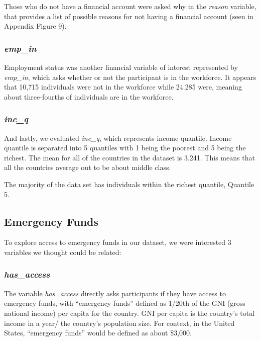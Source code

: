 \documentclass[water,article,submit,moreauthors,pdftex]{mdpi}
\begin{document}
Those who do not have a financial account were asked why in the
\emph{reason} variable, that provides a list of possible reasons for not
having a financial account (seen in Appendix Figure 9).

\hypertarget{emp_in}{%
\subsubsection{\texorpdfstring{\emph{emp\_in}}{emp\_in}}\label{emp_in}}

Employment status was another financial variable of interest represented
by \emph{emp\_in}, which asks whether or not the participant is in the
workforce. It appears that 10,715 individuals were not in the workforce
while 24.285 were, meaning about three-fourths of individuals are in the
workforce.

\hypertarget{inc_q}{%
\subsubsection{\texorpdfstring{\emph{inc\_q}}{inc\_q}}\label{inc_q}}

And lastly, we evaluated \emph{inc\_q}, which represents income
quantile. Income quantile is separated into 5 quantiles with 1 being the
poorest and 5 being the richest. The mean for all of the countries in
the dataset is 3.241. This means that all the countries average out to
be about middle class.

The majority of the data set has individuals within the richest
quantile, Quantile 5.

\hypertarget{emergency-funds}{%
\subsection{Emergency Funds}\label{emergency-funds}}

To explore access to emergency funds in our dataset, we were interested
3 variables we thought could be related:

\hypertarget{has_access}{%
\subsubsection{\texorpdfstring{\emph{has\_access}}{has\_access}}\label{has_access}}

The variable \emph{has\_access} directly asks participants if they have
access to emergency funds, with ``emergency funds'' defined as 1/20th of
the GNI (gross national income) per capita for the country. GNI per
capita is the country's total income in a year/ the country's population
size. For context, in the United States, ``emergency funds'' would be
defined as about \$3,000.
\end{document}
